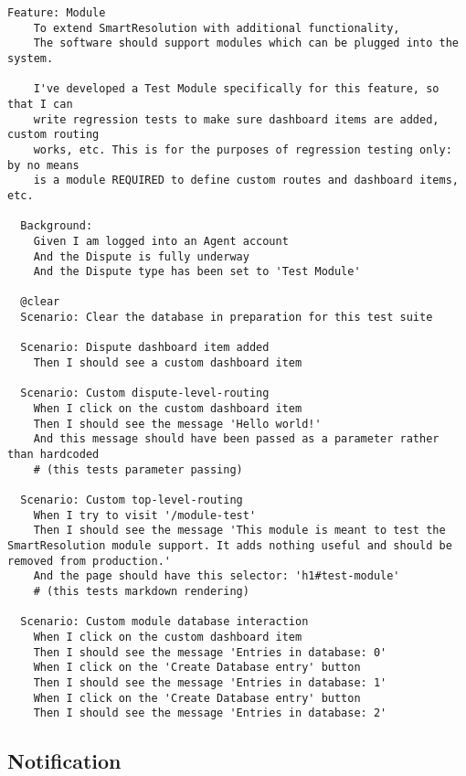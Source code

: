 \begin{lstlisting}
Feature: Module
    To extend SmartResolution with additional functionality,
    The software should support modules which can be plugged into the system.

    I've developed a Test Module specifically for this feature, so that I can
    write regression tests to make sure dashboard items are added, custom routing
    works, etc. This is for the purposes of regression testing only: by no means
    is a module REQUIRED to define custom routes and dashboard items, etc.

  Background:
    Given I am logged into an Agent account
    And the Dispute is fully underway
    And the Dispute type has been set to 'Test Module'

  @clear
  Scenario: Clear the database in preparation for this test suite

  Scenario: Dispute dashboard item added
    Then I should see a custom dashboard item

  Scenario: Custom dispute-level-routing
    When I click on the custom dashboard item
    Then I should see the message 'Hello world!'
    And this message should have been passed as a parameter rather than hardcoded
    # (this tests parameter passing)

  Scenario: Custom top-level-routing
    When I try to visit '/module-test'
    Then I should see the message 'This module is meant to test the SmartResolution module support. It adds nothing useful and should be removed from production.'
    And the page should have this selector: 'h1#test-module'
    # (this tests markdown rendering)

  Scenario: Custom module database interaction
    When I click on the custom dashboard item
    Then I should see the message 'Entries in database: 0'
    When I click on the 'Create Database entry' button
    Then I should see the message 'Entries in database: 1'
    When I click on the 'Create Database entry' button
    Then I should see the message 'Entries in database: 2'
\end{lstlisting}

\subsection{Notification}

